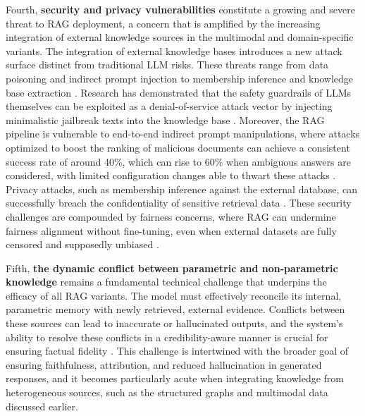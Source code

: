 \documentclass[11pt]{article}
\begin{document}
Fourth, \textbf{security and privacy vulnerabilities} constitute a growing and severe threat to RAG deployment, a concern that is amplified by the increasing integration of external knowledge sources in the multimodal and domain-specific variants. The integration of external knowledge bases introduces a new attack surface distinct from traditional LLM risks. These threats range from data poisoning and indirect prompt injection to membership inference and knowledge base extraction \cite{ref67,ref68}. Research has demonstrated that the safety guardrails of LLMs themselves can be exploited as a denial-of-service attack vector by injecting minimalistic jailbreak texts into the knowledge base \cite{ref69}. Moreover, the RAG pipeline is vulnerable to end-to-end indirect prompt manipulations, where attacks optimized to boost the ranking of malicious documents can achieve a consistent success rate of around 40\%, which can rise to 60\% when ambiguous answers are considered, with limited configuration changes able to thwart these attacks \cite{ref70}. Privacy attacks, such as membership inference against the external database, can successfully breach the confidentiality of sensitive retrieval data \cite{ref71}. These security challenges are compounded by fairness concerns, where RAG can undermine fairness alignment without fine-tuning, even when external datasets are fully censored and supposedly unbiased \cite{ref72}.

Fifth, \textbf{the dynamic conflict between parametric and non-parametric knowledge} remains a fundamental technical challenge that underpins the efficacy of all RAG variants. The model must effectively reconcile its internal, parametric memory with newly retrieved, external evidence. Conflicts between these sources can lead to inaccurate or hallucinated outputs, and the system's ability to resolve these conflicts in a credibility-aware manner is crucial for ensuring factual fidelity \cite{ref73}. This challenge is intertwined with the broader goal of ensuring faithfulness, attribution, and reduced hallucination in generated responses, and it becomes particularly acute when integrating knowledge from heterogeneous sources, such as the structured graphs and multimodal data discussed earlier.
\end{document}
